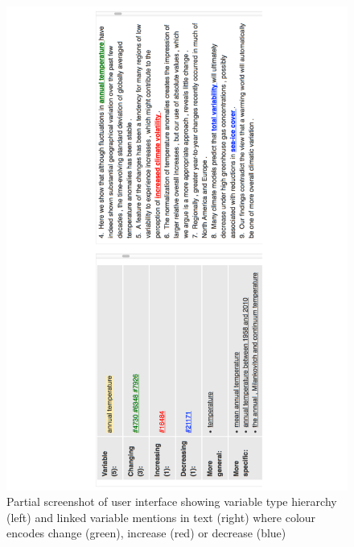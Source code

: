\documentclass[11pt]{article}
\begin{document}
\begin{figure}[!htb]
\setlength\fboxsep{0pt}
\setlength\fboxrule{0.5pt}
  \includegraphics[scale=0.54,angle=-90,clip=true,trim=56mm 1mm 53mm 0]{screenshot.pdf}
  \vspace{-4mm}
  \caption{Partial screenshot of user interface showing variable type hierarchy (left) and linked variable mentions in text (right)
  where colour encodes change (green), increase (red) or decrease (blue)}
\label{fig:ui}  
\end{figure}
\end{document}
